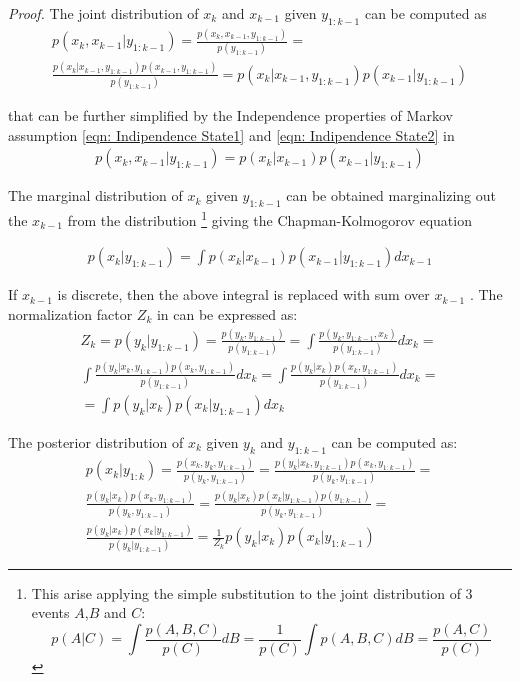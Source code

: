 \textit{Proof.} The joint distribution of $x_k$ and $x_{k-1}$ given $y_{1:k-1}$ can be computed as
\begin{eqnarray} \label{eqn: prof1}
p(x_k , x_{k-1} | y_{1:k-1} ) =   \frac{p(x_k , x_{k-1} , y_{1:k-1})}{p(y_{1:k-1})} = \nonumber \\
\frac{p(x_k | x_{k-1} , y_{1:k-1}) p(x_{k-1} , y_{1:k-1}) }{p(y_{1:k-1})} =
 p(x_k | x_{k-1} , y_{1:k-1}) p(x_{k-1} | y_{1:k-1}) 
\end{eqnarray}

that can be further simplified by the Independence properties of Markov assumption \ref{eqn: Indipendence State1} and \ref{eqn: Indipendence State2} in 
\begin{eqnarray} \label{eqn: prof2}
p(x_k , x_{k-1} | y_{1:k-1} )= p(x_k | x_{k-1} ) p(x_{k-1} | y_{1:k-1} )
\end{eqnarray}


The marginal distribution of $x_k$ given $y_{1:k-1}$ can be obtained marginalizing out the  $x_{k-1}$ from the distribution
\footnote{This arise applying the simple substitution to the joint distribution of 3 events
$A$,$B$ and $C$:
$$
p(A|C)=\int \frac{p(A,B,C)}{p(C)}dB=\frac{1}{p(C)}\int p(A,B,C)dB =\frac{p(A,C)}{p(C)}
$$
} 
 \label{eqn: prof2} giving the Chapman-Kolmogorov equation

\begin{eqnarray} \label{eqn: Chapman-Kolmogorov}
p(x_k | y_{1:k-1} )= \int p(x_k | x_{k-1} ) p(x_{k-1} | y_{1:k-1} ) dx_{k-1}
\end{eqnarray}

If $x_{k-1}$ is discrete, then the above integral is replaced with sum over $x_{k-1}$ .
The normalization factor $Z_k$ in can be expressed as:
\begin{eqnarray} \label{eqn: Normalization1}
Z_k =  p(y_k | y_{1:k-1})= \frac{p(y_k , y_{1:k-1})}{p( y_{1:k-1})} = 
\int \frac{ p( y_k , y_{1:k-1} , x_k) }{ p( y_{1:k-1}) } dx_k =  \\
\int \frac{ p(y_k | x_k , y_{1:k-1}) p(x_k , y_{1:k-1}) }{ p( y_{1:k-1}) } dx_k = 
\int \frac{ p(y_k | x_k) p(x_k , y_{1:k-1}) }{ p( y_{1:k-1}) } dx_k = \\
=\int p(y_k | x_k ) p(x_k | y_{1:k-1} ) dx_k
\end{eqnarray}

The posterior distribution of $x_k$ given $y_k$ and $y_{1:k-1}$ can be computed as:
\begin{eqnarray} \label{eqn: Posterior}
p(x_k | y_{1:k} )=  \frac{ p(x_k , y_k , y_{1:k-1} )}{ p(y_k , y_{1:k-1})} =
 \frac{ p(y_k | x_k , y_{1:k-1}) p(x_k , y_{1:k-1}) }{  p(y_k , y_{1:k-1})} = \\
 \frac{ p(y_k | x_k) p(x_k , y_{1:k-1}) }{ p(y_k , y_{1:k-1}) } =
 \frac{ p(y_k | x_k) p(x_k | y_{1:k-1}) p(y_{1:k-1}) }{ p(y_k , y_{1:k-1}) } = \\
 \frac{ p(y_k | x_k) p(x_k | y_{1:k-1})}{ p(y_k | y_{1:k-1}) } =
 \frac{1}{Z_k} p(y_k | x_k) p(x_k | y_{1:k-1})
\end{eqnarray}

 